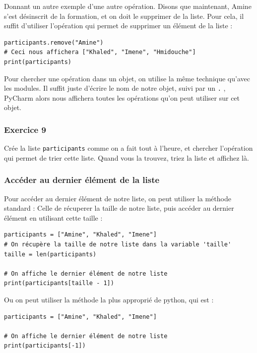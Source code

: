 \documentclass[12pt]{article}
\newcommand{\code}[1]{\colorbox{light-gray}{\texttt{#1}}}
\begin{document}
            Donnant un autre exemple d'une autre opération. Disons que maintenant, Amine s'est désinscrit de
            la formation, et on doit le supprimer de la liste. Pour cela, il suffit d'utiliser l'opération
            qui permet de supprimer un élément de la liste :
            \begin{lstlisting}[style=code]
participants.remove("Amine")
# Ceci nous affichera ["Khaled", "Imene", "Hmidouche"]
print(participants)
            \end{lstlisting}

            Pour chercher une opération dans un objet, on utilise la même technique qu'avec les modules. Il suffit
            juste d'écrire le nom de notre objet, suivi par un \code{.} , PyCharm alors nous affichera toutes les
            opérations qu'on peut utiliser sur cet objet.

        \subsubsection{Exercice 9}
            Crée la liste \code{participants} comme on a fait tout à l'heure, et chercher l'opération qui permet
            de trier cette liste. Quand vous la trouvez, triez la liste et affichez là.

        \subsubsection{Accéder au dernier élément de la liste}
            Pour accéder au dernier élément de notre liste, on peut utiliser la méthode standard : Celle de récuperer
            la taille de notre liste, puis accéder au dernier élément en utilisant cette taille :
            \begin{lstlisting}[style=code]
participants = ["Amine", "Khaled", "Imene"]
# On récupère la taille de notre liste dans la variable 'taille'
taille = len(participants)

# On affiche le dernier élément de notre liste
print(participants[taille - 1])
            \end{lstlisting}

            Ou on peut utiliser la méthode la plus approprié de python, qui est :
            \begin{lstlisting}[style=code]
participants = ["Amine", "Khaled", "Imene"]

# On affiche le dernier élément de notre liste
print(participants[-1])
            \end{lstlisting}
\end{document}
